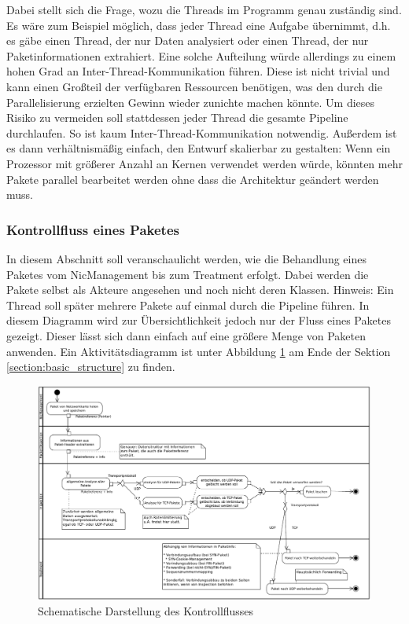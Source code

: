 \documentclass[../review_2.tex]{subfiles}
\begin{document}
Dabei stellt sich die Frage, wozu die Threads im Programm genau zuständig sind. Es wäre zum Beispiel möglich, dass jeder Thread eine Aufgabe übernimmt, d.h. es gäbe einen Thread, der nur Daten analysiert oder einen Thread, der nur Paketinformationen extrahiert. Eine solche Aufteilung würde allerdings zu einem hohen Grad an Inter-Thread-Kommunikation führen. Diese ist nicht trivial und kann einen Großteil der verfügbaren Ressourcen benötigen, was den durch die Parallelisierung erzielten Gewinn wieder zunichte machen könnte. Um dieses Risiko zu vermeiden soll stattdessen jeder Thread die gesamte Pipeline durchlaufen. So ist kaum Inter-Thread-Kommunikation notwendig. Außerdem ist es dann verhältnismäßig einfach, den Entwurf skalierbar zu gestalten: Wenn ein Prozessor mit größerer Anzahl an Kernen verwendet werden würde, könnten mehr Pakete parallel bearbeitet werden ohne dass die Architektur geändert werden muss.

\subsubsection{Kontrollfluss eines Paketes}

In diesem Abschnitt soll veranschaulicht werden, wie die Behandlung eines Paketes vom NicManagement bis zum Treatment erfolgt. Dabei werden die Pakete selbst als Akteure angesehen und noch nicht deren Klassen. Hinweis: Ein Thread soll später mehrere Pakete auf einmal durch die Pipeline führen. In diesem Diagramm wird zur Übersichtlichkeit jedoch nur der Fluss eines Paketes gezeigt. Dieser lässt sich dann einfach auf eine größere Menge von Paketen anwenden. Ein Aktivitätsdiagramm ist unter Abbildung \ref{fig:control_flow} am Ende der Sektion \ref{section:basic_structure} zu finden.

\begin{figure}[h]
    \centering
    \includegraphics[angle=270, width=0.8\linewidth]{img/activity_control_flow.pdf}
    \caption{Schematische Darstellung des Kontrollflusses}
    \label{fig:control_flow}
\end{figure}
\end{document}
